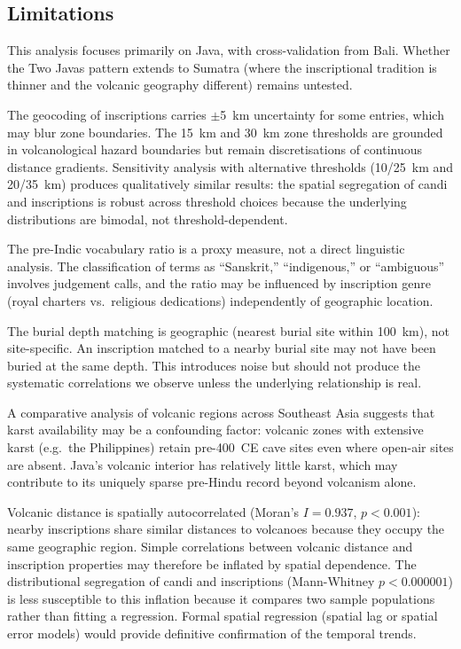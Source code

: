 \documentclass[12pt]{article}
\begin{document}
\subsection{Limitations}

This analysis focuses primarily on Java, with cross-validation from Bali.
Whether the Two Javas pattern extends to Sumatra (where the inscriptional tradition is thinner and the volcanic geography different) remains untested.

The geocoding of inscriptions carries $\pm$5~km uncertainty for some entries, which may blur zone boundaries.
The 15~km and 30~km zone thresholds are grounded in volcanological hazard boundaries but remain discretisations of continuous distance gradients.
Sensitivity analysis with alternative thresholds (10/25~km and 20/35~km) produces qualitatively similar results: the spatial segregation of candi and inscriptions is robust across threshold choices because the underlying distributions are bimodal, not threshold-dependent.

The pre-Indic vocabulary ratio is a proxy measure, not a direct linguistic analysis.
The classification of terms as ``Sanskrit,'' ``indigenous,'' or ``ambiguous'' involves judgement calls, and the ratio may be influenced by inscription genre (royal charters vs.\ religious dedications) independently of geographic location.

The burial depth matching is geographic (nearest burial site within 100~km), not site-specific.
An inscription matched to a nearby burial site may not have been buried at the same depth.
This introduces noise but should not produce the systematic correlations we observe unless the underlying relationship is real.

A comparative analysis of volcanic regions across Southeast Asia suggests that karst availability may be a confounding factor: volcanic zones with extensive karst (e.g.\ the Philippines) retain pre-400~CE cave sites even where open-air sites are absent.
Java's volcanic interior has relatively little karst, which may contribute to its uniquely sparse pre-Hindu record beyond volcanism alone.

Volcanic distance is spatially autocorrelated (Moran's $I = 0.937$, $p < 0.001$): nearby inscriptions share similar distances to volcanoes because they occupy the same geographic region.
Simple correlations between volcanic distance and inscription properties may therefore be inflated by spatial dependence.
The distributional segregation of candi and inscriptions (Mann-Whitney $p < 0.000001$) is less susceptible to this inflation because it compares two sample populations rather than fitting a regression.
Formal spatial regression (spatial lag or spatial error models) would provide definitive confirmation of the temporal trends.
\end{document}

